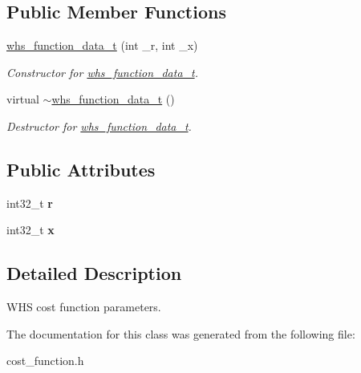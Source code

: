 \subsection*{Public Member Functions}
\begin{DoxyCompactItemize}
\item 
\mbox{\label{classsbgen_1_1whs__function__data__t_a1eb0140cf0b22d36495fd25c60f21c8d}} 
\hyperlink{classsbgen_1_1whs__function__data__t_a1eb0140cf0b22d36495fd25c60f21c8d}{whs\+\_\+function\+\_\+data\+\_\+t} (int \+\_\+r, int \+\_\+x)
\begin{DoxyCompactList}\small\item\em Constructor for \hyperlink{classsbgen_1_1whs__function__data__t}{whs\+\_\+function\+\_\+data\+\_\+t}. \end{DoxyCompactList}\item 
\mbox{\label{classsbgen_1_1whs__function__data__t_a8fd6d919760750bbb0500a2b3de1a7c4}} 
virtual \hyperlink{classsbgen_1_1whs__function__data__t_a8fd6d919760750bbb0500a2b3de1a7c4}{$\sim$whs\+\_\+function\+\_\+data\+\_\+t} ()
\begin{DoxyCompactList}\small\item\em Destructor for \hyperlink{classsbgen_1_1whs__function__data__t}{whs\+\_\+function\+\_\+data\+\_\+t}. \end{DoxyCompactList}\end{DoxyCompactItemize}
\subsection*{Public Attributes}
\begin{DoxyCompactItemize}
\item 
\mbox{\label{classsbgen_1_1whs__function__data__t_a91e8321b0a68d5c8ad3e23279dfffaa3}} 
int32\+\_\+t {\bfseries r}
\item 
\mbox{\label{classsbgen_1_1whs__function__data__t_a015320e04276f9455d437951fb662c32}} 
int32\+\_\+t {\bfseries x}
\end{DoxyCompactItemize}


\subsection{Detailed Description}
W\+HS cost function parameters. 

The documentation for this class was generated from the following file\+:\begin{DoxyCompactItemize}
\item 
cost\+\_\+function.\+h\end{DoxyCompactItemize}
